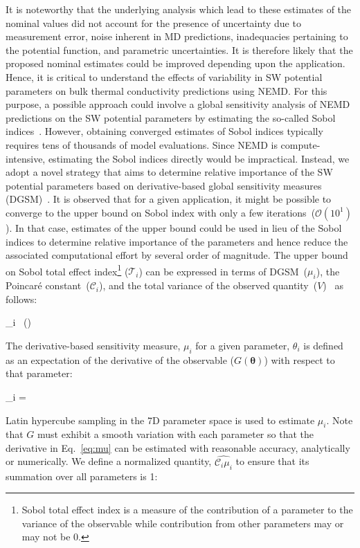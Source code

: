 It is noteworthy that the underlying analysis which lead to these estimates of the nominal values did not
account for the presence of uncertainty due to
measurement error, noise inherent in MD predictions, inadequacies pertaining to the potential function,
and parametric uncertainties. It is therefore likely that the proposed nominal estimates could be 
improved depending upon the application. Hence, it is critical to understand the effects of variability in
SW potential parameters on bulk thermal conductivity predictions using NEMD. For this purpose, a possible
approach could involve a global sensitivity analysis of NEMD predictions on the SW potential parameters 
by estimating the so-called Sobol indices~\cite{Sobol:2001}. However, obtaining converged estimates of
Sobol indices typically requires tens of thousands of model evaluations. Since NEMD is compute-intensive,
estimating the Sobol indices directly would be impractical. Instead, we adopt a novel strategy that
aims to determine relative importance of the SW potential parameters based on derivative-based global 
sensitivity measures (DGSM)~\cite{Sobol:2010}. It is observed that for a given application, it might be possible to 
converge to the upper bound on
Sobol index with only a few iterations~($\mathcal{O}(10^{1})$). 
In that case, estimates of the upper bound could be used in lieu of the
Sobol indices to determine relative importance of the parameters and hence reduce the associated computational
effort by several order of magnitude. The upper bound on 
Sobol total effect index\footnote{Sobol total effect index is a measure of the contribution of a 
parameter to the variance of the observable while contribution from other parameters may or may not be 0.}
($\mathcal{T}_i$) can be expressed in terms of DGSM~($\mu_i$), the Poincar\' e 
constant~($\mathcal{C}_i$), and the total variance of the observed
quantity~($V$)~\cite{Lamboni:2013,Roustant:2014} as follows:   

\be
{}_i \leq {}~(\propto {}) 
\ee 

\noindent The derivative-based sensitivity measure, $\mu_i$ for a given parameter, $\theta_i$ is
defined as an expectation
of the derivative of the observable ($G(\bm{\theta})$) with respect to that parameter:

\be
\mu_i = 
\label{eq:mu}
\ee

\noindent Latin hypercube sampling in the 7D parameter space is used to estimate $\mu_i$. Note that $G$ must 
exhibit a smooth variation with each parameter so that the derivative in Eq.~\ref{eq:mu} can be estimated
with reasonable accuracy, analytically or numerically. 
We define a normalized quantity, $\hat{\mathcal{C}_i\mu_i}$ to ensure that its summation over all parameters is 1:

